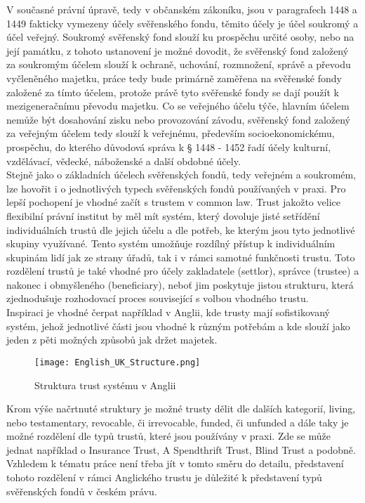 \documentclass{article}
\begin{document}
\indent V současné právní úpravě, tedy v občanském zákoníku, jsou v paragrafech 1448 a 1449 fakticky vymezeny účely svěřenského fondu, těmito účely je účel soukromý a účel veřejný. Soukromý svěřenský fond slouží ku prospěchu určité osoby, nebo na její památku, z tohoto ustanovení je možné dovodit, že svěřenský fond založený za soukromým účelem slouží k ochraně, uchování, rozmnožení, správě a převodu vyčleněného majetku, práce tedy bude primárně zaměřena na svěřenské fondy založené za tímto účelem, protože právě tyto svěřenské fondy se dají použít k mezigeneračnímu převodu majetku. Co se veřejného účelu týče, hlavním účelem nemůže být dosahování zisku nebo provozování závodu, svěřenský fond založený za veřejným účelem tedy slouží k veřejnému, především socioekonomickému, prospěchu, do kterého důvodová správa k § 1448 - 1452 řadí účely kulturní, vzdělávací, vědecké, náboženské a další obdobné účely. \\

Stejně jako o základních účelech svěřenských fondů, tedy veřejném a soukromém, lze hovořit i o jednotlivých typech svěřenských fondů používaných v praxi. Pro lepší pochopení je vhodné začít s trustem v common law. Trust jakožto velice flexibilní právní institut by měl mít systém, který dovoluje jisté setřídění individuálních trustů dle jejich účelu a dle potřeb, ke kterým jsou tyto jednotlivé skupiny využívané. Tento systém umožňuje rozdílný přístup k individuálním skupinám lidí jak ze strany úřadů, tak i v rámci samotné funkčnosti trustu. Toto rozdělení trustů je také vhodné pro účely zakladatele (settlor), správce (trustee) a nakonec i obmyšleného (beneficiary), neboť jim poskytuje jistou strukturu, která zjednodušuje rozhodovací proces související s volbou vhodného trustu.\\

Inspiraci je vhodné čerpat například v Anglii, kde trusty mají sofistikovaný systém, jehož jednotlivé části jsou vhodné k různým potřebám a kde slouží jako jeden z pěti možných způsobů jak držet majetek.\\

\begin{figure}[h]
\centering
\texttt{[image: English\_UK\_Structure.png]}
\caption{Struktura trust systému v Anglii}
\label{fig:struktura}
\end{figure}

Krom výše načrtnuté struktury je možné trusty dělit dle dalších kategorií, living, nebo testamentary, revocable, či irrevocable, funded, či unfunded a dále taky je možné rozdělení dle typů trustů, které jsou používány v praxi. Zde se může jednat například o Insurance Trust, A Spendthrift Trust, Blind Trust a podobně. Vzhledem k tématu práce není třeba jít v tomto směru do detailu, představení tohoto rozdělení v rámci Anglického trustu je důležité k představení typů svěřenských fondů v českém právu.\\
\end{document}
